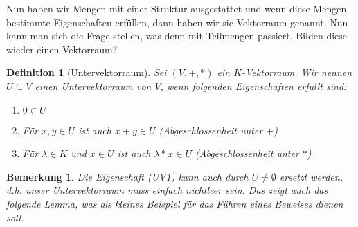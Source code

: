 \documentclass[ngerman, a4paper, 12pt]{scrartcl}
\newcounter{themcount}
\theoremstyle{plain}
\newtheorem{definition}[themcount]{Definition}
\newtheorem{bemerkung}[themcount]{Bemerkung}
\theoremstyle{proofstyle}
\begin{document}
	Nun haben wir Mengen mit einer Struktur ausgestattet und wenn diese Mengen bestimmte Eigenschaften erfüllen, dann haben wir sie Vektorraum genannt. Nun kann man sich die Frage stellen, was denn mit Teilmengen passiert. Bilden diese wieder einen Vektorraum?
	
	\begin{definition}[Untervektorraum]
		Sei $(V,+,*)$ ein $K$-Vektorraum. Wir nennen $U \subseteq V$ einen Untervektorraum von $V$, wenn folgenden Eigenschaften erfüllt sind:
		\begin{enumerate}[label=(UV\arabic*), leftmargin=*]
			\item $0 \in U$
			\item Für $x,y \in U$ ist auch $x+y \in U$ (Abgeschlossenheit unter $+$)
			\item Für $\lambda \in K$ und $x \in U$ ist auch $\lambda * x \in U$ (Abgeschlossenheit unter $*$)
		\end{enumerate}
	\end{definition}

	\begin{bemerkung}
		Die Eigenschaft (UV1) kann auch durch $U \neq \emptyset$ ersetzt werden, d.h. unser Untervektorraum muss einfach nichtleer sein. Das zeigt auch das folgende Lemma, was als kleines Beispiel für das Führen eines Beweises dienen soll.
	\end{bemerkung}
\end{document}
